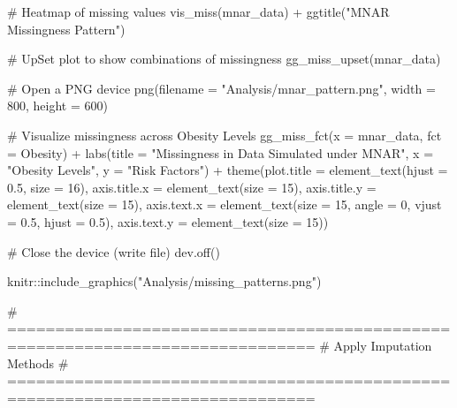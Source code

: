 \documentclass[
  letterpaper,
  DIV=11,
  numbers=noendperiod]{scrartcl}
\newenvironment{Shaded}{\begin{snugshade}}{\end{snugshade}}
\newcommand{\AttributeTok}[1]{\textcolor[rgb]{0.40,0.45,0.13}{#1}}
\newcommand{\CommentTok}[1]{\textcolor[rgb]{0.37,0.37,0.37}{#1}}
\newcommand{\DecValTok}[1]{\textcolor[rgb]{0.68,0.00,0.00}{#1}}
\newcommand{\FloatTok}[1]{\textcolor[rgb]{0.68,0.00,0.00}{#1}}
\newcommand{\FunctionTok}[1]{\textcolor[rgb]{0.28,0.35,0.67}{#1}}
\newcommand{\NormalTok}[1]{\textcolor[rgb]{0.00,0.23,0.31}{#1}}
\newcommand{\SpecialCharTok}[1]{\textcolor[rgb]{0.37,0.37,0.37}{#1}}
\newcommand{\StringTok}[1]{\textcolor[rgb]{0.13,0.47,0.30}{#1}}
\begin{document}
\begin{Shaded}
\begin{Highlighting}[]
\CommentTok{\# Heatmap of missing values}
\FunctionTok{vis\_miss}\NormalTok{(mnar\_data) }\SpecialCharTok{+} \FunctionTok{ggtitle}\NormalTok{(}\StringTok{"MNAR Missingness Pattern"}\NormalTok{)}

\CommentTok{\# UpSet plot to show combinations of missingness}
\FunctionTok{gg\_miss\_upset}\NormalTok{(mnar\_data) }

\CommentTok{\# Open a PNG device}
\FunctionTok{png}\NormalTok{(}\AttributeTok{filename =} \StringTok{"Analysis/mnar\_pattern.png"}\NormalTok{, }\AttributeTok{width =} \DecValTok{800}\NormalTok{, }\AttributeTok{height =} \DecValTok{600}\NormalTok{)}

\CommentTok{\# Visualize missingness across Obesity Levels}
\FunctionTok{gg\_miss\_fct}\NormalTok{(}\AttributeTok{x =}\NormalTok{ mnar\_data, }\AttributeTok{fct =}\NormalTok{ Obesity) }\SpecialCharTok{+} 
  \FunctionTok{labs}\NormalTok{(}\AttributeTok{title =} \StringTok{"Missingness in Data Simulated under MNAR"}\NormalTok{,}
       \AttributeTok{x =} \StringTok{"Obesity Levels"}\NormalTok{, }\AttributeTok{y =} \StringTok{"Risk Factors"}\NormalTok{) }\SpecialCharTok{+}
\FunctionTok{theme}\NormalTok{(}\AttributeTok{plot.title =} \FunctionTok{element\_text}\NormalTok{(}\AttributeTok{hjust =} \FloatTok{0.5}\NormalTok{, }\AttributeTok{size =} \DecValTok{16}\NormalTok{),}
    \AttributeTok{axis.title.x =} \FunctionTok{element\_text}\NormalTok{(}\AttributeTok{size =} \DecValTok{15}\NormalTok{),}
    \AttributeTok{axis.title.y =} \FunctionTok{element\_text}\NormalTok{(}\AttributeTok{size =} \DecValTok{15}\NormalTok{),}
    \AttributeTok{axis.text.x =} \FunctionTok{element\_text}\NormalTok{(}\AttributeTok{size =} \DecValTok{15}\NormalTok{, }\AttributeTok{angle =} \DecValTok{0}\NormalTok{, }\AttributeTok{vjust =} \FloatTok{0.5}\NormalTok{, }\AttributeTok{hjust =} \FloatTok{0.5}\NormalTok{),}
    \AttributeTok{axis.text.y =} \FunctionTok{element\_text}\NormalTok{(}\AttributeTok{size =} \DecValTok{15}\NormalTok{))}

\CommentTok{\# Close the device (write file)}
\FunctionTok{dev.off}\NormalTok{()}

\NormalTok{knitr}\SpecialCharTok{::}\FunctionTok{include\_graphics}\NormalTok{(}\StringTok{"Analysis/missing\_patterns.png"}\NormalTok{)}

\CommentTok{\# ==============================================================================}
\CommentTok{\# Apply Imputation Methods}
\CommentTok{\# ==============================================================================}


\end{Highlighting}
\end{Shaded}
\end{document}
